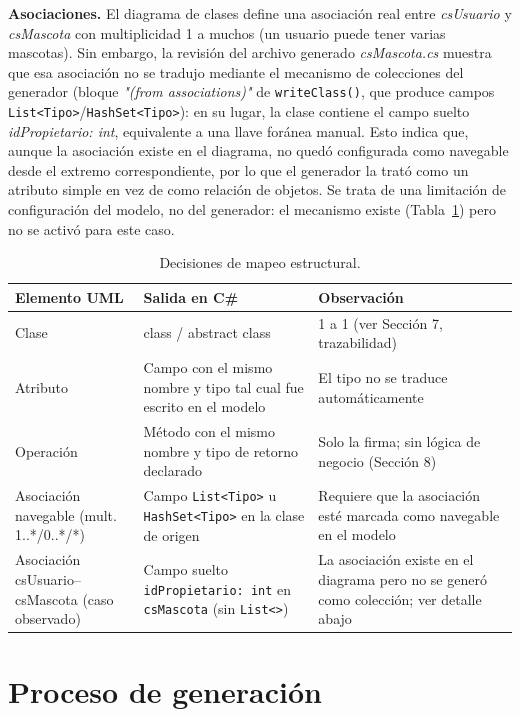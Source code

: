 \documentclass[journal,onecolumn]{IEEEtran}
\begin{document}
\textbf{Asociaciones.} El diagrama de clases define una asociación real entre \textit{csUsuario} y \textit{csMascota} con multiplicidad 1 a muchos (un usuario puede tener varias mascotas). Sin embargo, la revisión del archivo generado \textit{csMascota.cs} muestra que esa asociación no se tradujo mediante el mecanismo de colecciones del generador (bloque \textit{"(from associations)"} de \texttt{writeClass()}, que produce campos \texttt{List<Tipo>}/\texttt{HashSet<Tipo>}): en su lugar, la clase contiene el campo suelto \textit{idPropietario: int}, equivalente a una llave foránea manual. Esto indica que, aunque la asociación existe en el diagrama, no quedó configurada como navegable desde el extremo correspondiente, por lo que el generador la trató como un atributo simple en vez de como relación de objetos. Se trata de una limitación de configuración del modelo, no del generador: el mecanismo existe (Tabla~\ref{tab:mapeo_estructural}) pero no se activó para este caso.

\begin{table}[H]
	\centering
	\caption{Decisiones de mapeo estructural.}
	\label{tab:mapeo_estructural}
	\begin{tabular}{|p{3.3cm}|p{4.3cm}|p{4.8cm}|}
		\hline
		\textbf{Elemento UML} & \textbf{Salida en C\#} & \textbf{Observación} \\
		\hline
		Clase & class / abstract class & 1 a 1 (ver Sección 7, trazabilidad) \\
		\hline
		Atributo & Campo con el mismo nombre y tipo tal cual fue escrito en el modelo & El tipo no se traduce automáticamente \\
		\hline
		Operación & Método con el mismo nombre y tipo de retorno declarado & Solo la firma; sin lógica de negocio (Sección 8) \\
		\hline
		Asociación navegable (mult. 1..*/0..*/*) & Campo \texttt{List<Tipo>} u \texttt{HashSet<Tipo>} en la clase de origen & Requiere que la asociación esté marcada como navegable en el modelo \\
		\hline
		Asociación csUsuario--csMascota (caso observado) & Campo suelto \texttt{idPropietario: int} en \texttt{csMascota} (sin \texttt{List<>}) & La asociación existe en el diagrama pero no se generó como colección; ver detalle abajo \\
		\hline
	\end{tabular}
\end{table}

\section{Proceso de generación}
\end{document}
